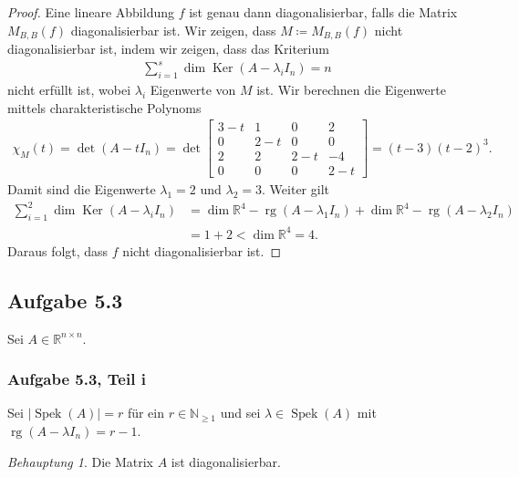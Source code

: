 \documentclass[draft,a5paper]{article}
\theoremstyle{remark}
\newtheorem*{beh}{Behauptung}
\DeclareMathOperator{\Spek}{Spek}
\DeclareMathOperator{\Ker}{Ker}
\DeclareMathOperator{\rg}{rg}
\newcommand{\envert}[1]{\left\lvert#1\right\rvert}
\begin{document}
\begin{proof}
  Eine lineare Abbildung
  \(f\) ist genau dann diagonalisierbar, falls die Matrix
  \(M_{B,B}(f)\) diagonalisierbar ist.  Wir zeigen, dass
  \(M \coloneq M_{B,B}(f)\) nicht diagonalisierbar ist, indem wir zeigen, dass
  das Kriterium
  \begin{align*}
    \sum_{i=1}^{s}{\dim \Ker(A-\lambda_{i}I_{n})} = n
  \end{align*}
  nicht erfüllt ist, wobei \(\lambda_{i}\) Eigenwerte von \(M\) ist.  Wir
  berechnen die Eigenwerte mittels charakteristische Polynoms
  \begin{align*}
    \chi_{M}(t) = \det(A - tI_{n}) =
    \det
    \begin{bmatrix}
      3 - t & 1 & 0 & 2 \\
      0 & 2 -t & 0 & 0 \\
      2 & 2 & 2 - t & -4 \\
      0 & 0 & 0 & 2 -t
    \end{bmatrix}
    = (t-3)(t-2)^{3}.
  \end{align*}
  Damit sind die Eigenwerte \(\lambda_{1} = 2\) und
  \(\lambda_{2} = 3\).  Weiter gilt
  \begin{align*}
    \sum_{i=1}^{2}{\dim \Ker(A-\lambda_{i}I_{n})}
    &= \dim \mathbb{R}^{4} - \rg (A-\lambda_{1}I_{n})
      + \dim \mathbb{R}^{4} - \rg (A-\lambda_{2}I_{n}) \\
    &= 1 + 2 < \dim \mathbb{R}^{4} = 4.
  \end{align*}
  Daraus folgt, dass \(f\) nicht diagonalisierbar ist.
\end{proof}

\subsection*{Aufgabe 5.3}

Sei \(A \in \mathbb{R}^{n \times n}\).

\subsubsection*{Aufgabe 5.3, Teil i}

Sei \(\envert{\Spek(A)} = r\)  für ein \(r \in \mathbb{N}_{\ge 1}\) und sei \(\lambda \in
\Spek(A)\) mit \(\rg(A - \lambda I_{n}) = r - 1\).

\begin{beh}
  Die Matrix \(A\) ist diagonalisierbar.
\end{beh}
\end{document}
